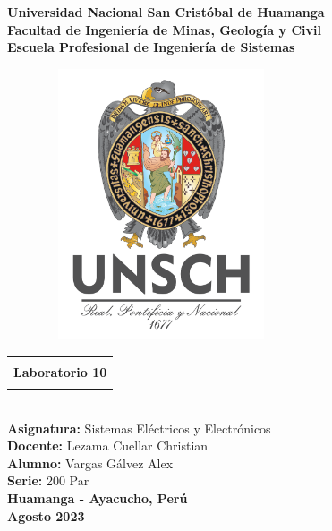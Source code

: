 \begin{titlepage}
	\begin{center}
		{\LARGE\textbf{Universidad Nacional San Cristóbal de Huamanga}}\\
		\vspace{0.5cm}
		{\LARGE\textbf{Facultad de Ingeniería de Minas, Geología y Civil}}\\
		\vspace{0.5cm}
		{\LARGE\textbf{Escuela Profesional de Ingeniería de Sistemas}}\\
		\vspace{1cm}
		\begin{figure}[h]
			\centering
			\includegraphics[width=7cm, height=8cm]{imagenes/logo}
		\end{figure}
		\vspace{0.75cm}
		\begin{tabular}{|c|}
			\hline
			\\
			{\Large\textbf{ Laboratorio 10  }}\\
			\\
			\hline
		\end{tabular}\\
		\vspace{0.75cm}
		{\Large\textbf{Asignatura: } Sistemas Eléctricos y Electrónicos}\\
		\vspace{0.75cm}
		{\Large\textbf{Docente: } Lezama Cuellar Christian}\\
		\vspace{0.75cm}
		{\Large\textbf{Alumno: }Vargas Gálvez Alex}\\
		\vspace{0.75cm}
		{\large\textbf{Serie: }200 Par}\\
		\vspace{ 1.5cm}
		{\huge \textbf{Huamanga - Ayacucho, Perú}}\\
		\vspace{1cm}
		{\huge \textbf{Agosto 2023}}
	\end{center}
\end{titlepage}